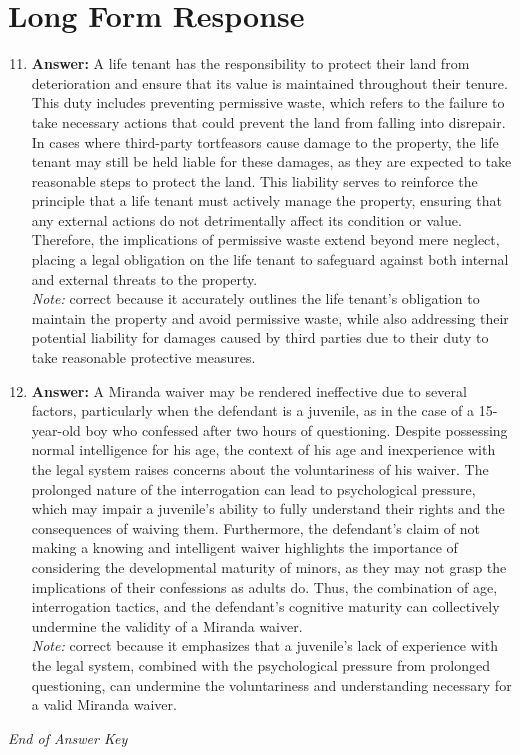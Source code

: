 \documentclass[12pt]{article}
\begin{document}
\section*{Long Form Response}
\begin{enumerate}[label=\arabic*.]
\setcounter{enumi}{10}
\item \textbf{Answer:} A life tenant has the responsibility to protect their land from deterioration and ensure that its value is maintained throughout their tenure. This duty includes preventing permissive waste, which refers to the failure to take necessary actions that could prevent the land from falling into disrepair. In cases where third-party tortfeasors cause damage to the property, the life tenant may still be held liable for these damages, as they are expected to take reasonable steps to protect the land. This liability serves to reinforce the principle that a life tenant must actively manage the property, ensuring that any external actions do not detrimentally affect its condition or value. Therefore, the implications of permissive waste extend beyond mere neglect, placing a legal obligation on the life tenant to safeguard against both internal and external threats to the property.
\\ \textit{Note:} correct because it accurately outlines the life tenant's obligation to maintain the property and avoid permissive waste, while also addressing their potential liability for damages caused by third parties due to their duty to take reasonable protective measures.
\item \textbf{Answer:} A Miranda waiver may be rendered ineffective due to several factors, particularly when the defendant is a juvenile, as in the case of a 15-year-old boy who confessed after two hours of questioning. Despite possessing normal intelligence for his age, the context of his age and inexperience with the legal system raises concerns about the voluntariness of his waiver. The prolonged nature of the interrogation can lead to psychological pressure, which may impair a juvenile's ability to fully understand their rights and the consequences of waiving them. Furthermore, the defendant's claim of not making a knowing and intelligent waiver highlights the importance of considering the developmental maturity of minors, as they may not grasp the implications of their confessions as adults do. Thus, the combination of age, interrogation tactics, and the defendant's cognitive maturity can collectively undermine the validity of a Miranda waiver.
\\ \textit{Note:} correct because it emphasizes that a juvenile's lack of experience with the legal system, combined with the psychological pressure from prolonged questioning, can undermine the voluntariness and understanding necessary for a valid Miranda waiver.
\end{enumerate}

\vfill
\noindent\textit{End of Answer Key}
\end{document}
